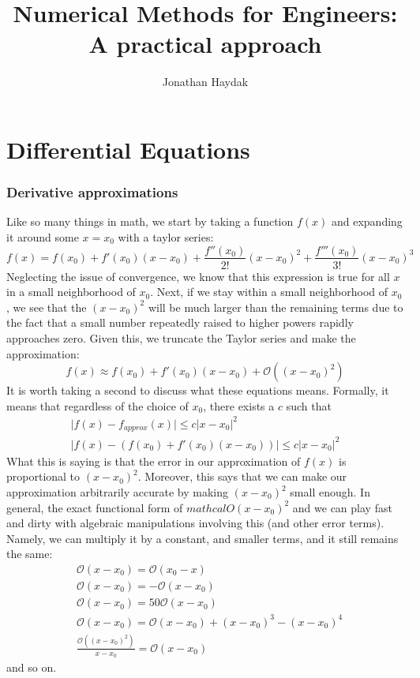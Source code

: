 \documentclass[]{article}
\title{Numerical Methods for Engineers: A practical approach}
\author{Jonathan Haydak}
\theoremstyle{definition}
\numberwithin{equation}{section}
\begin{document}
	\maketitle
	\setlength\cellspacetoplimit{4pt}
	\setlength\cellspacebottomlimit{4pt}
	\tableofcontents
	\newcommand{\dydx}[2]{\frac{\text{d}{#1}}{\text{d} {#2}}}
	\newcommand{\der}[1]{\frac{\partial}{\partial {#1}}}
	\part{Differential Equations}
	\section{Derivative approximations}
	Like so many things in math, we start by taking a function $f(x)$ and expanding it around some $x = x_0$ with a taylor series:
	\begin{equation}
	f(x) = f(x_0) + f'(x_0) (x-x_0) + \frac{f''(x_0)}{2!} (x-x_0)^2 + \frac{f'''(x_0)}{3!} (x-x_0)^3 
	\end{equation}
	Neglecting the issue of convergence, we know that this expression is true for all $x$ in a small neighborhood of $x_0$. Next, if we stay within a small neighborhood of $x_0$, we see that the $(x-x_0)^2$ will be much larger than the remaining terms due to the fact that a small number repeatedly raised to higher powers rapidly approaches zero. Given this, we truncate the Taylor series and make the approximation:
	\begin{equation}
	f(x) \approx f(x_0) + f'(x_0) (x-x_0) + \mathcal{O}\left((x-x_0)^2 \right) \label{d1}
	\end{equation}
	It is worth taking a second to discuss what these equations means. Formally, it means that regardless of the choice of $x_0$, there exists a $c$ such that 
	\begin{align}
	\lvert f(x) - f_{approx}(x) \rvert \leq c \lvert x- x_0 \rvert^2 \nonumber \\
	\lvert f(x) - \left( f(x_0) + f'(x_0) (x-x_0) \right) \rvert \leq c \lvert x- x_0 \rvert^2
	\end{align}
	What this is saying is that the error in our approximation of $f(x)$ is proportional to $(x-x_0)^2$. Moreover, this says that we can make our approximation arbitrarily accurate by making $(x-x_0)^2$ small enough. In general, the exact functional form of $mathcal{O}(x-x_0)^2$ and we can play fast and dirty with algebraic manipulations involving this (and other error terms). Namely, we can multiply it by a constant, and smaller terms, and it still remains the same:
	\begin{align*}
	&\mathcal{O} (x-x_0) = \mathcal{O} (x_0 - x) \\
	&\mathcal{O}(x-x_0) = -\mathcal{O}(x-x_0) \\
	&\mathcal{O}(x-x_0) = 50\mathcal{O}(x-x_0) \\
	&\mathcal{O}(x-x_0) = \mathcal{O}(x-x_0) + (x-x_0)^3 - (x-x_0)^4 \\
	&\frac{\mathcal{O}(\left(x-x_0\right)^2)}{x-x_0} = \mathcal{O}(x-x_0) 
	\end{align*}
	and so on.
	
\end{document}
